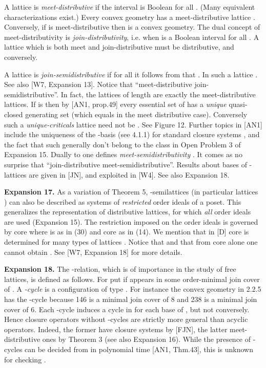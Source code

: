 \documentclass[11pt]{article}
\begin{document}
A lattice  is {\it meet-distributive} if the interval  is Boolean for all . (Many equivalent characterizations exist.) Every convex geometry  has a meet-distributive lattice . Conversely, if  is meet-distributive then  is a convex geometry. 
 The dual concept of meet-distributivity is {\it join-distributivity}, i.e. when 
 is a Boolean interval for all .  A lattice which is both meet and join-distributive must be distributive, and conversely.



 
 
 
A lattice  is {\it join-semidistributive}  if for all  it follows from  that . 
In such a lattice . See also [W7, Expansion 13].  Notice that ``meet-distributive  join-semidistributive''. In fact, the  lattices  of length  are exactly the meet-distributive lattices. If  is  then by [AN1, prop.49] every essential set  of  has a {\it unique} quasi-closed generating set  (which equals  in the meet distributive case). Conversely such a {\it unique-criticals} lattice need not be . See Figure 12.   Further topics in [AN1] include the uniqueness of the -basis (see 4.1.1) for  standard closure systems , and the fact that such  generally don't belong to the class  in Open Problem 3 of Expansion 15. Dually to  one defines {\it meet-semidistributivity} .  It comes as no surprise that ``join-distributive  
meet-semidistributive''. Results about bases of -lattices are given in [JN], and exploited in [W4].  See also Expansion 18.



{\bf Expansion 17.} As a variation of Theorem 5, -semilattices (in particular lattices ) can also be described as systems of {\it restricted} order ideals of a poset. This generalizes the representation of  distributive lattices, for which {\it all} order ideals are used (Expansion 15). The restriction imposed on the order ideals is governed by core where  is as in (30) and core as in (14). We mention that in [D] core is determined for many types of lattices . Notice that  and that from core alone one cannot obtain . See [W7, Expansion 18] for more details.

 
{\bf Expansion 18.} The -relation, which is of importance in the study of free lattices, is defined as follows. For  put  if  appears in some order-minimal join cover  of . A {\it -cycle} is a configuration of type . For instance the convex geometry in 2.2.5 has the -cycle  because 146 is a minimal join cover of 8 and 238 is a minimal join cover of 6.
Each -cycle induces a cycle in  for each base  of , but not conversely. Hence closure operators without -cycles are strictly more general than acyclic operators.
Indeed, the former have  closure systems by [FJN], the latter meet-distributive ones by Theorem 3 (see also Expansion 16). While the presence of -cycles can be decided from  in polynomial time [AN1, Thm.43], this is unknown for checking .
\end{document}
